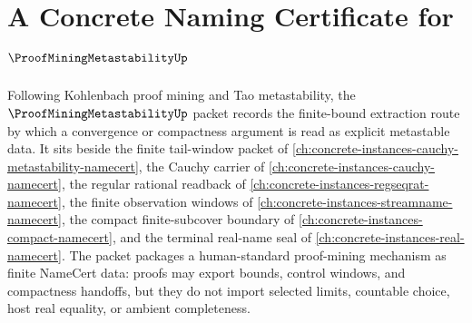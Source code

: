 \chapter{A Concrete Naming Certificate for $\ProofMiningMetastabilityUp$}
\label{ch:concrete-instances-proof-mining-metastability-namecert}

Following Kohlenbach proof mining and Tao metastability, the $\ProofMiningMetastabilityUp$ packet records the finite-bound extraction route by which a convergence or compactness argument is read as explicit metastable data. It sits beside the finite tail-window packet of \autoref{ch:concrete-instances-cauchy-metastability-namecert}, the Cauchy carrier of \autoref{ch:concrete-instances-cauchy-namecert}, the regular rational readback of \autoref{ch:concrete-instances-regseqrat-namecert}, the finite observation windows of \autoref{ch:concrete-instances-streamname-namecert}, the compact finite-subcover boundary of \autoref{ch:concrete-instances-compact-namecert}, and the terminal real-name seal of \autoref{ch:concrete-instances-real-namecert}. The packet packages a human-standard proof-mining mechanism as finite NameCert data: proofs may export bounds, control windows, and compactness handoffs, but they do not import selected limits, countable choice, host real equality, or ambient completeness.

